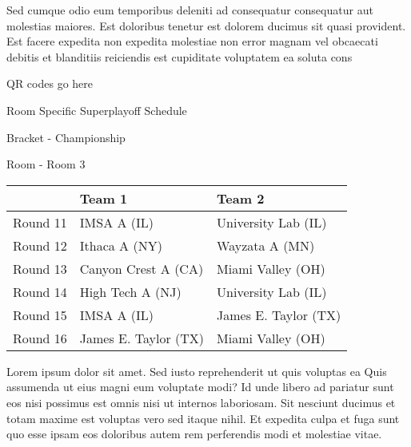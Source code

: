 \documentclass{article}%
\begin{document}
\newline%
    Sed cumque odio eum temporibus deleniti ad consequatur consequatur aut molestias maiores. Est doloribus tenetur est dolorem ducimus sit quasi provident. Est facere expedita non expedita molestiae non error magnam vel obcaecati debitis et blanditiis reiciendis est cupiditate voluptatem ea soluta cons%
\vspace*{140pt}%
\begin{center}%
\begin{Huge}%
QR codes go here%
\end{Huge}%
\end{center}%
\newpage%
\begin{center}%
\begin{Huge}%
Room Specific Superplayoff Schedule%
\end{Huge}%
\vspace*{8pt}%
\linebreak%
\begin{Large}%
Bracket {-} Championship%
\end{Large}%
\vspace*{8pt}%
\linebreak%
\vspace*{8pt}%
\begin{Large}%
Room {-} Room 3%
\end{Large}%
\end{center}%
%
\begin{tabularx}{\textwidth}{|c|Y|Y|}%
\hline%
&Team 1&Team 2\\%
\hline%
Round 11&IMSA A (IL)&University Lab (IL)\\%
Round 12&Ithaca A (NY)&Wayzata A (MN)\\%
Round 13&Canyon Crest A (CA)&Miami Valley (OH)\\%
Round 14&High Tech A (NJ)&University Lab (IL)\\%
Round 15&IMSA A (IL)&James E. Taylor (TX)\\%
Round 16&James E. Taylor (TX)&Miami Valley (OH)\\%
\hline%
\end{tabularx}%
\vspace*{8pt}%
\newline%
    Lorem ipsum dolor sit amet. Sed iusto reprehenderit ut quis voluptas ea Quis assumenda ut eius magni eum voluptate modi? Id unde libero ad pariatur sunt eos nisi possimus est omnis nisi ut internos laboriosam. Sit nesciunt ducimus et totam maxime est voluptas vero sed itaque nihil. Et expedita culpa et fuga sunt quo esse ipsam eos doloribus autem rem perferendis modi et molestiae vitae.\newline%
\end{document}
